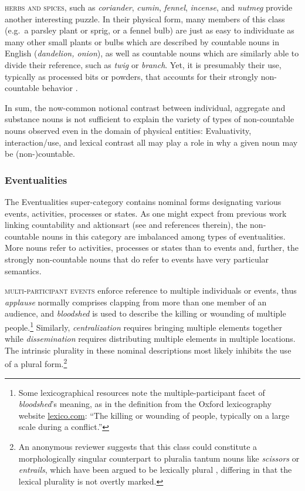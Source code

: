 \documentclass[output=paper]{langscibook}
\begin{document}


\textsc{herbs and spices}, such as \textit{coriander}, \textit{cumin}, \textit{fennel}, \textit{incense}, and \textit{nutmeg} provide another interesting puzzle.  In their physical form, many members of this class (e.g.\ a parsley plant or sprig, or a fennel bulb) are just as easy to individuate as many other small plants or bulbs which are described by countable  nouns in English (\textit{dandelion, onion}), as well as countable nouns which are similarly able to divide their reference, such as \textit{twig} or \textit{branch}.  Yet, it is presumably their use, typically as processed bits or powders, that accounts for their strongly non-countable behavior \citep{Wierzbicka1988}.

In sum, the now-common notional contrast between individual, aggregate and substance nouns is not sufficient to explain the variety of types of non-countable nouns observed even in the domain of physical entities: Evaluativity, interaction/use, and lexical contrast all may play a role in why a given noun may be (non-)countable.

\subsubsection{Eventualities} The Eventualities super-category contains nominal forms designating various events, activities, processes or states.  As one might expect from previous work linking countability and aktionsart (see \citealt{Mourelatos1978, grimm2014individuating} and references therein), the non-countable nouns in this category are imbalanced among types of eventualities. More nouns refer to activities, processes or states than to events and, further, the strongly non-countable nouns that do refer to events have very particular semantics.

\begin{sloppypar}
\textsc{multi-participant events} enforce  reference to multiple individuals or events, thus \textit{applause} normally comprises clapping from more than one member of an audience, and \textit{bloodshed} is used to describe the killing or wounding of multiple people.\footnote{Some lexicographical resources note the multiple-participant facet of \textit{bloodshed}'s meaning, as in the definition from the Oxford lexicography website \url{lexico.com}: ``The killing or wounding of people, typically on a large scale during a conflict.''}  Similarly, \textit{centralization} requires bringing multiple elements together  while  
\textit{dissemination} requires distributing multiple elements in multiple locations.  The intrinsic plurality in these nominal descriptions most likely inhibits the use of a plural form.\footnote{An anonymous reviewer suggests that this class could constitute a morphologically singular counterpart to pluralia tantum nouns like \textit{scissors} or \textit{entrails}, which have been argued to be lexically plural \citep{Acquaviva2008}, differing in that the lexical plurality is not overtly marked.}
\end{sloppypar}
\end{document}

